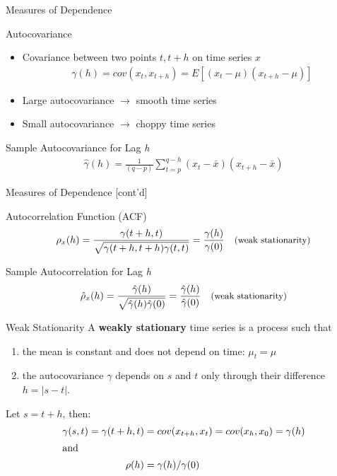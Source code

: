 \documentclass[ignorenonframetext,xcolor=x11names]{beamer}
\begin{document}
\begin{frame}{Measures of Dependence}
\begin{block}{Autocovariance}
\begin{itemize}
   \item Covariance between two points $t, t+h$ on time series $x$ 
\begin{align*}
\gamma(h) = cov(x_t, x_{t+h}) = E [ (x_t - \mu)(x_{t+h} - \mu)] 
\end{align*}
\vspace{-\baselineskip}
   \item Large autocovariance $\rightarrow$ smooth time series
   \item Small autocovariance $\rightarrow$ choppy time series
\end{itemize}
\end{block}
\begin{block}{Sample Autocovariance for Lag \emph{h}}
\begin{align*}
\hat{\gamma}(h)  = \frac{1}{(q-p)} \sum_{t=p}^{q-h} (x_t - \bar{x})(x_{t+h} - \bar{x})
\end{align*}
\end{block}
\end{frame}

\begin{frame}{Measures of Dependence \small [cont'd]}
\begin{block}{Autocorrelation Function (ACF)}
\begin{align*}
\rho_x(h) = \frac{\gamma (t+h,t)}{\sqrt{\gamma (t+h,t+h) \gamma(t, t)}} = \frac{\gamma(h)}{\gamma(0)}  \quad \text{\small (weak stationarity)}
\end{align*}
\end{block}
\begin{block}{Sample Autocorrelation for Lag \emph{h}}
\begin{align*}
\hat\rho_x(h) = \frac{\hat\gamma(h)}{\sqrt{\hat\gamma(h) \hat\gamma(0)}} = \frac{\hat\gamma(h)}{\hat\gamma(0)} \quad \text{\small (weak stationarity)}
\end{align*}
\end{block}
\end{frame}


\begin{frame}{Weak Stationarity}
A \textbf{weakly stationary} time series is a process such that
\begin{enumerate}
\item the mean is constant and does not depend on time: $\mu_t = \mu$
\item the autocovariance $\gamma$ depends on $s$ and $t$ only through their difference $h=|s-t|$.
\end{enumerate}
Let $s = t + h$, then:
\begin{align*}
\gamma(s, t) = \gamma(t+h, t) &= cov(x_{t+h}, x_t) = cov(x_h, x_0) = \gamma(h) \\
\intertext{and}
\rho(h) &= \gamma(h) / \gamma(0)
\end{align*}
\end{frame}
\end{document}
